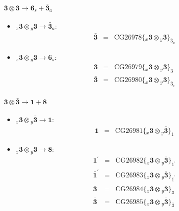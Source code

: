 \documentclass[english]{article}
\newcommand{\rep}[1]{\mathbf{#1}}
\newcommand{\repx}[2]{{}_{#2}\mathbf{#1}}
\newcommand{\subcg}[3]{\big\{ \repx{#1}{x}\otimes\repx{#2}{y}\big\}^{}_{#3}}
\begin{document}
\paragraph*{\Large $\rep{3}\otimes\rep{3}\to\rep{6}_s+\rep{\bar{3}}_a$}
\begin{itemize}
\item $\repx{3}{x}\otimes\repx{3}{y}\to\rep{\bar{3}}_{a}$:
\begin{eqnarray*}
\rep{\bar{3}} &=& \text{CG26978}\subcg{3}{3}{\bar{3}_{a}}
\end{eqnarray*}
\item $\repx{3}{x}\otimes\repx{3}{y}\to\rep{6}_{s}$:
\begin{eqnarray*}
\rep{3} &=& \text{CG26979}\subcg{3}{3}{3}
\\
\rep{\bar{3}} &=& \text{CG26980}\subcg{3}{3}{\bar{3}_{s}}
\end{eqnarray*}
\end{itemize}
\paragraph*{\Large $\rep{3}\otimes\rep{\bar{3}}\to\rep{1}+\rep{8}$}
\begin{itemize}
\item $\repx{3}{x}\otimes\repx{\bar{3}}{y}\to\rep{1}$:
\begin{eqnarray*}
\rep{1} &=& \text{CG26981}\subcg{3}{\bar{3}}{1}
\end{eqnarray*}
\item $\repx{3}{x}\otimes\repx{\bar{3}}{y}\to\rep{8}$:
\begin{eqnarray*}
\rep{1^{\prime}} &=& \text{CG26982}\subcg{3}{\bar{3}}{1^{\prime}}
\\
\rep{\bar{1}^{\prime}} &=& \text{CG26983}\subcg{3}{\bar{3}}{\bar{1}^{\prime}}
\\
\rep{3} &=& \text{CG26984}\subcg{3}{\bar{3}}{3}
\\
\rep{\bar{3}} &=& \text{CG26985}\subcg{3}{\bar{3}}{\bar{3}}
\end{eqnarray*}
\end{itemize}
\end{document}
